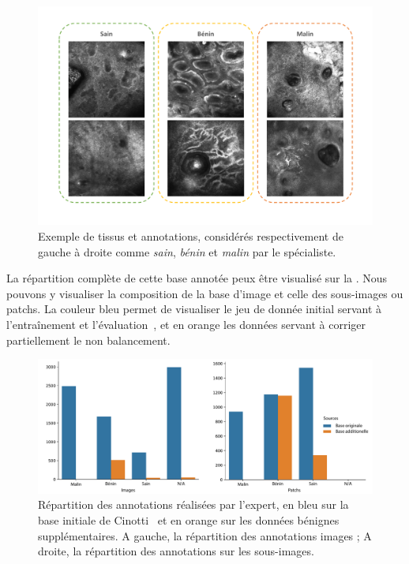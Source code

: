 \begin{figure}[H]
    \begin{center}
        \includegraphics[width=\linewidth]{contents/iii_preamble_microscopy/resources/example_rcm_data.pdf}
        \caption{Exemple de tissus et annotations, considérés respectivement de gauche à droite comme \textit{sain}, \textit{bénin} et \textit{malin} par le spécialiste.}
        \label{fig:example_rcm_data}
    \end{center} 
\end{figure}\par

La répartition complète de cette base annotée peux être visualisé sur la . Nous pouvons y visualiser la composition de la base d'image et celle des sous-images ou patchs. La couleur bleu permet de visualiser le jeu de donnée initial servant à l'entraînement et l'évaluation~\cite{Cinotti2018}, et en orange les données servant à corriger partiellement le non balancement.\par

\begin{figure}[H]
    \begin{center}
        \includegraphics[width=\linewidth]{contents/iii_preamble_microscopy/resources/scheme_rcm_statistics.pdf}
        \caption{Répartition des annotations réalisées par l'expert, en bleu sur la base initiale de Cinotti~\cite{Cinotti2018} et en orange sur les données bénignes supplémentaires. A gauche, la répartition des annotations images ; A droite, la répartition des annotations sur les sous-images.}
        \label{fig:scheme_rcm_statistics}
    \end{center} 
\end{figure}\par

